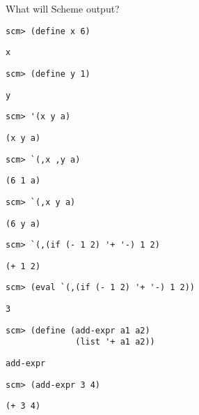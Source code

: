 \begin{blocksection}
\question What will Scheme output?


\begin{lstlisting}
scm> (define x 6)
\end{lstlisting}
\begin{solution}[0.25in] 
\texttt{x}
\end{solution}

\begin{lstlisting}
scm> (define y 1)
\end{lstlisting}
\begin{solution}[0.25in]
\texttt{y}
\end{solution}

\begin{lstlisting}
scm> '(x y a)
\end{lstlisting}
\begin{solution}[0.25in]
\texttt{(x y a)}
\end{solution}

\begin{lstlisting}
scm> `(,x ,y a)
\end{lstlisting}
\begin{solution}[.25in]
\texttt{(6 1 a)}
\end{solution}

\begin{lstlisting}
scm> `(,x y a)
\end{lstlisting}
\begin{solution}[.25in]
\texttt{(6 y a)}
\end{solution}

\begin{lstlisting}
scm> `(,(if (- 1 2) '+ '-) 1 2)
\end{lstlisting}
\begin{solution}[.25in]
\texttt{(+ 1 2)}
\end{solution}

\begin{lstlisting}
scm> (eval `(,(if (- 1 2) '+ '-) 1 2))
\end{lstlisting}
\begin{solution}[.25in]
\texttt{3}
\end{solution}


\begin{lstlisting}
scm> (define (add-expr a1 a2)
              (list '+ a1 a2))
\end{lstlisting}
\begin{solution}[.25in]
\texttt{add-expr}
\end{solution}

\begin{lstlisting}
scm> (add-expr 3 4)
\end{lstlisting}
\begin{solution}[.25in]
\texttt{(+ 3 4)}
\end{solution}

\end{blocksection}
